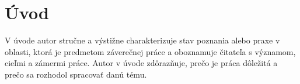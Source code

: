 \chapter{Úvod}

V úvode autor stručne a výstižne charakterizuje stav poznania alebo praxe v oblasti, ktorá je predmetom záverečnej práce a oboznamuje čitateľa s významom, cieľmi a zámermi práce. Autor v úvode zdôrazňuje, prečo je práca dôležitá a prečo sa rozhodol spracovať danú tému.
